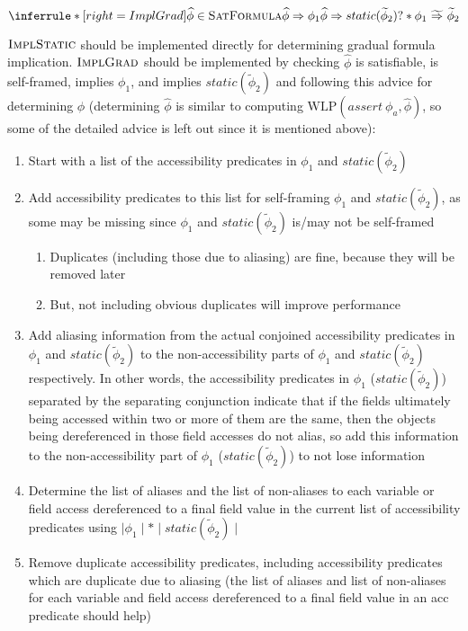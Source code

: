 \documentclass {article}
\newcommand{\fphi}{\widehat{\phi}}
\newcommand{\tphi}{\widetilde{\phi}}
\newcommand{\imp}{\Rightarrow}
\newcommand{\timp}{\ \widetilde{\Rightarrow}\ }
\newcommand{\wlp}[2]{\text{WLP}(#1,#2)}
\newcommand{\satdef}{\textsc{SatFormula}}
\newcommand{\implsdef}{\textsc{ImplStatic}}
\newcommand{\implgdef}{\textsc{ImplGrad}}
\begin{document}
\[
\inferrule*[right=ImplGrad]
   {\fphi \in \satdef \\ \fphi \imp \phi_1 \\ \fphi \imp static(\tphi_2)}
   {? \ast \phi_1 \timp \tphi_2}
\]

$\implsdef$ should be implemented directly for determining gradual formula implication. $\implgdef$ should be implemented by checking $\fphi$ is satisfiable, is self-framed, implies $\phi_1$, and implies $static(\tphi_2)$ and following this advice for determining $\fphi$ (determining $\fphi$ is similar to computing $\wlp{assert\ \phi_a}{\fphi}$, so some of the detailed advice is left out since it is mentioned above):

\begin{enumerate}
\item Start with a list of the accessibility predicates in $\phi_1$ and $static(\tphi_2)$
\item Add accessibility predicates to this list for self-framing $\phi_1$ and $static(\tphi_2)$, as some may be missing since $\phi_1$ and $static(\tphi_2)$ is/may not be self-framed
	\begin{enumerate}
	\item Duplicates (including those due to aliasing) are fine, because they will be removed later
	\item But, not including obvious duplicates will improve performance
	\end{enumerate}
\item Add aliasing information from the actual conjoined accessibility predicates in $\phi_1$ and $static(\tphi_2)$ to the non-accessibility parts of $\phi_1$ and $static(\tphi_2)$ respectively. In other words, the accessibility predicates in $\phi_1$ ($static(\tphi_2)$) separated by the separating conjunction indicate that if the fields ultimately being accessed within two or more of them are the same, then the objects being dereferenced in those field accesses do not alias, so add this information to the non-accessibility part of $\phi_1$ ($static(\tphi_2)$) to not lose information
\item Determine the list of aliases and the list of non-aliases to each variable or field access dereferenced to a final field value in the current list of accessibility predicates using $\mid \phi_1 \mid \ast \mid static(\tphi_2) \mid$
\item Remove duplicate accessibility predicates, including accessibility predicates which are duplicate due to aliasing (the list of aliases and list of non-aliases for each variable and field access dereferenced to a final field value in an acc predicate should help)

\end{enumerate}
\end{document}
